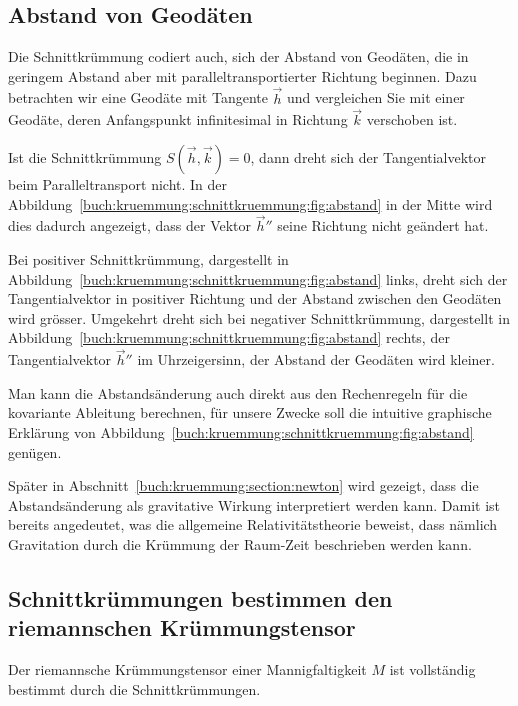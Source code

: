 %
%
\subsection{Abstand von Geodäten}

Die Schnittkrümmung codiert auch, sich der Abstand von Geodäten,
die in geringem Abstand aber mit paralleltransportierter Richtung
beginnen.
Dazu betrachten wir eine Geodäte mit Tangente $\vec{h}$ und
vergleichen Sie mit einer Geodäte, deren Anfangspunkt infinitesimal
in Richtung $\vec{k}$ verschoben ist.

Ist die Schnittkrümmung $S(\vec{h},\vec{k})=0$, dann dreht sich der
Tangentialvektor beim Paralleltransport nicht.
In der Abbildung~\ref{buch:kruemmung:schnittkruemmung:fig:abstand}
in der Mitte wird dies dadurch angezeigt, dass der Vektor $\vec{h}''$
seine Richtung nicht geändert hat.

Bei positiver Schnittkrümmung, dargestellt in
Abbildung~\ref{buch:kruemmung:schnittkruemmung:fig:abstand}
links, dreht sich der Tangentialvektor in positiver Richtung und der
Abstand zwischen den Geodäten wird grösser.
Umgekehrt dreht sich bei negativer Schnittkrümmung, dargestellt in
Abbildung~\ref{buch:kruemmung:schnittkruemmung:fig:abstand} rechts,
der Tangentialvektor $\vec{h}''$ im Uhrzeigersinn, der Abstand
der Geodäten wird kleiner.

Man kann die Abstandsänderung auch direkt aus den Rechenregeln für
die kovariante Ableitung berechnen, für unsere Zwecke soll die
intuitive graphische Erklärung von 
Abbildung~\ref{buch:kruemmung:schnittkruemmung:fig:abstand}
genügen.

Später in Abschnitt~\ref{buch:kruemmung:section:newton} wird gezeigt,
dass die Abstandsänderung als gravitative Wirkung interpretiert
werden kann.
Damit ist bereits angedeutet, was die allgemeine Relativitätstheorie
beweist, dass nämlich Gravitation durch die Krümmung der Raum-Zeit
beschrieben werden kann.

%
%
\subsection{Schnittkrümmungen bestimmen den riemannschen
Krüm\-mungs\-ten\-sor}

\begin{satz}
Der riemannsche Krümmungstensor einer Mannigfaltigkeit $M$
ist vollständig bestimmt durch die Schnittkrümmungen.
\end{satz}

